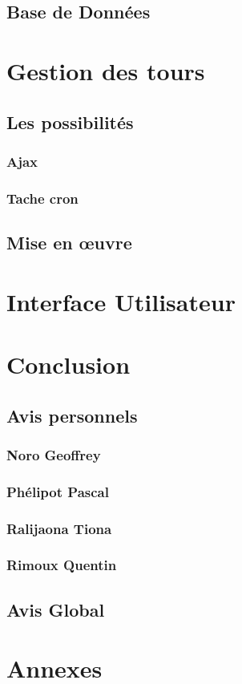\documentclass[11pt,a4paper]{article}
\begin{document}
\subsection{Base de Données}

\newpage\section{Gestion des tours}
\subsection{Les possibilités}
\subsubsection{Ajax}
\subsubsection{Tache cron}
\subsection{Mise en œuvre}

\newpage\section{Interface Utilisateur}

\newpage\section{Conclusion}
\subsection{Avis personnels}
\subsubsection{Noro Geoffrey}
\subsubsection{Phélipot Pascal}
\subsubsection{Ralijaona Tiona}
\subsubsection{Rimoux Quentin}
\subsection{Avis Global}

\newpage{}
\section{Annexes}
\end{document}
